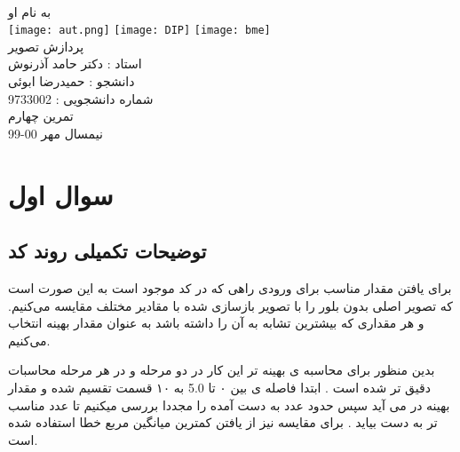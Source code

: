 \documentclass[12pt]{article}
\begin{document}
	\doublespacing
	\begin{titlepage}
		\paragraph*{}
		\centering
			
			
			{\small به نام او}\\
			\vspace{1cm}
			\texttt{[image: aut.png]}
			\hspace{1cm}
			\texttt{[image: DIP]}
			\hspace{1cm}
			\texttt{[image: bme]}\\
			\vspace{2cm}
			{\Huge پردازش تصویر}\\
			\vspace{2cm}
			{\large استاد : دکتر حامد آذرنوش}\\
			\vspace{0.5cm}
			{\small  دانشجو :‌ حمیدرضا ابوئی}\\
			\vspace{0.5cm}
			{\small شماره دانشجویی : 9733002}\\
			\vspace{0.5cm}
			{\small تمرین چهارم}\\
			\vfill
			{\tiny نیمسال مهر 00-99}
	\end{titlepage}
	\thispagestyle{plain}
	\tableofcontents
	\newpage
	\doublespacing
	\section{سوال اول}
		\subsection{توضیحات تکمیلی روند کد}
		برای یافتن مقدار مناسب برای ورودی 
		راهی که در کد موجود است به این صورت است که تصویر اصلی بدون بلور را با تصویر بازسازی شده با مقادیر مختلف
		 مقایسه می‌کنیم. و هر مقداری که بیشترین تشابه به آن را داشته باشد به عنوان مقدار بهینه انتخاب می‌کنیم. 
		 
		 بدین منظور برای محاسبه ی بهینه تر این کار در دو مرحله و در هر مرحله محاسبات دقیق تر شده است . ابتدا فاصله ی بین ۰ تا 5.0 به ۱۰ قسمت تقسیم شده و مقدار بهینه در می آید سپس حدود عدد به دست آمده را مجددا بررسی میکنیم تا عدد مناسب تر به دست بیاید . برای مقایسه نیز از یافتن کمترین میانگین مربع خطا استفاده شده است.
	
\end{document}

